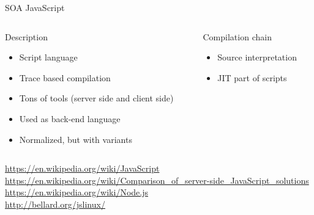 %
\begin{Frame}{SOA JavaScript}
  \begin{columns}[t]
    \begin{column}{5cm} %
      \begin{block}{Description}
        \begin{itemize}
        \item Script language
        \item Trace based compilation\TBD
        \item Tons of tools (server side and client side)\TBD
        \item Used as back-end language
        \item Normalized, but with variants
        \end{itemize}
      \end{block} 
    \end{column}
    
    \begin{column}{5cm} %
      \begin{block}{Compilation chain}
        \begin{itemize}
        \item Source interpretation
        \item JIT part of scripts \TBD
        \end{itemize}
      \end{block}   
    \end{column}
  \end{columns}
\url{https://en.wikipedia.org/wiki/JavaScript}\\
\url{https://en.wikipedia.org/wiki/Comparison_of_server-side_JavaScript_solutions}\\
\url{https://en.wikipedia.org/wiki/Node.js} \\
\url{http://bellard.org/jslinux/}

\end{Frame}


